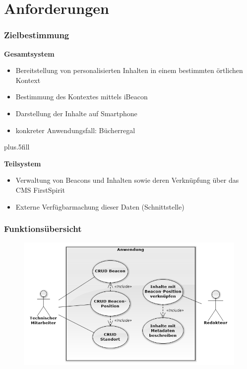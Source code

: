 \documentclass{beamer}
\begin{document}
\section{Anforderungen}

\begin{frame}
\frametitle<presentation>{Zielbestimmung}

  \textbf{Gesamtsystem}
  \begin{itemize}
    \item Bereitstellung von \alert{personalisierten Inhalten} in einem
  bestimmten örtlichen Kontext
  \item Bestimmung des Kontextes mittels \alert{iBeacon}
  \item Darstellung der Inhalte auf \alert{Smartphone}
  \item konkreter Anwendungsfall: \alert{Bücherregal}
  \end{itemize}

\vskip0pt plus.5fill

\textbf{Teilsystem}

\begin{itemize}
  \item Verwaltung von Beacons und Inhalten sowie deren Verknüpfung über das CMS
  FirstSpirit
  \item Externe Verfügbarmachung dieser Daten (Schnittstelle)
\end{itemize}

\end{frame}

\begin{frame}
\frametitle<presentation>{Funktionsübersicht}

\begin{figure}[!h]
\centering
\includegraphics[scale=0.55]{./Abbildungen/Classdiagram2.png}
\label{fig:usecasediagram}
\end{figure}

\end{frame}
\end{document}
